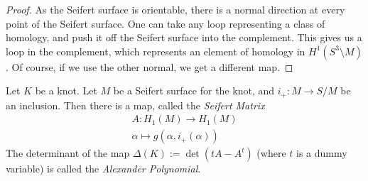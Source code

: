 \begin{proof}
As the Seifert surface is orientable, there is a normal direction at every point of the Seifert surface. One can take any loop representing a class of homology, and push it off the Seifert surface into the complement. This gives us a loop in the complement, which represents an element of homology in $H^1(S^3\setminus M)$. Of course, if we use the other normal, we get a different map. 
\end{proof}
\begin{definition}
Let $K$ be a knot. Let $M$ be a Seifert surface for the knot, and $i_+: M\to S/M$ be an inclusion. Then there is a map, called the \emph{Seifert Matrix} 
\begin{align*}
A: H_1(M)\to H_1(M)\\
\alpha\mapsto g(\alpha, i_+(\alpha))
\end{align*}
The determinant of the map  $\Delta(K):=\det (tA-A^t)$ (where $t$ is a dummy variable) is called the \emph{Alexander Polynomial}. 
\end{definition}

